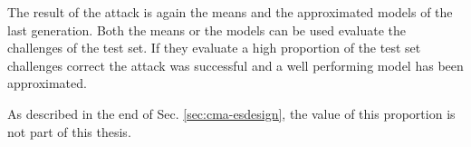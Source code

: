 The result of the attack is again the means and the approximated models of the last generation.
Both the means or the models can be used evaluate the challenges of the test set. 
If they evaluate a high proportion of the test set challenges correct the attack was successful and a well performing model has been approximated. %

As described in the end of Sec. \ref{sec:cma-esdesign}, the value of this proportion is not part of this thesis.










